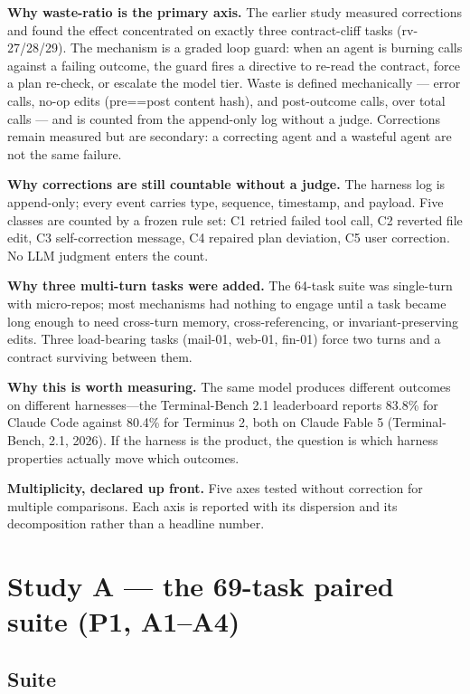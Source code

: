 \documentclass[11pt]{article}
\begin{document}
\textbf{Why waste-ratio is the primary axis.} The earlier study measured corrections and found the effect concentrated on exactly three contract-cliff tasks (rv-27/28/29). The mechanism is a graded loop guard: when an agent is burning calls against a failing outcome, the guard fires a directive to re-read the contract, force a plan re-check, or escalate the model tier. Waste is defined mechanically --- error calls, no-op edits (pre==post content hash), and post-outcome calls, over total calls --- and is counted from the append-only log without a judge. Corrections remain measured but are secondary: a correcting agent and a wasteful agent are not the same failure.

\textbf{Why corrections are still countable without a judge.} The harness log is append-only; every event carries type, sequence, timestamp, and payload. Five classes are counted by a frozen rule set: C1 retried failed tool call, C2 reverted file edit, C3 self-correction message, C4 repaired plan deviation, C5 user correction. No LLM judgment enters the count.

\textbf{Why three multi-turn tasks were added.} The 64-task suite was single-turn with micro-repos; most mechanisms had nothing to engage until a task became long enough to need cross-turn memory, cross-referencing, or invariant-preserving edits. Three load-bearing tasks (mail-01, web-01, fin-01) force two turns and a contract surviving between them.

\textbf{Why this is worth measuring.} The same model produces different outcomes on different harnesses---the Terminal-Bench 2.1 leaderboard reports 83.8\% for Claude Code against 80.4\% for Terminus 2, both on Claude Fable 5 (Terminal-Bench, 2.1, 2026). If the harness is the product, the question is which harness properties actually move which outcomes.

\textbf{Multiplicity, declared up front.} Five axes tested without correction for multiple comparisons. Each axis is reported with its dispersion and its decomposition rather than a headline number.

\section{Study A --- the 69-task paired suite (P1, A1--A4)}
\label{sec:studya}

\subsection{Suite}
\end{document}
